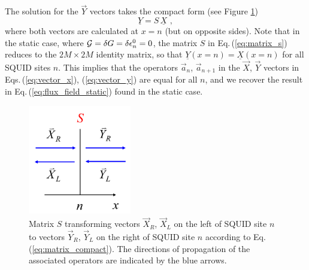 The solution for the $\vec{Y}$ vectors takes the compact form (see Figure \ref{fig:xy})
%
\begin{equation} \label{eq:matrix_compact}
    \underline{Y} = S \, \underline{X} \, \, ,
\end{equation}
%
where both vectors are calculated at $x=n$ (but on opposite sides).
Note that in the static case, where ${\cal G} = \delta G = \delta \epsilon_n^0 = 0$,
the matrix
$S$ in Eq.\,(\ref{eq:matrix_s}) reduces to the $2M \times 2M$ identity matrix,
so that $\underline{Y}(x=n) = \underline{X}(x=n)$ for all SQUID sites $n$. 
This implies that the operators $\vec{a}_n$, $\vec{a}_{n+1}$ 
in the $\vec{X}$, $\vec{Y}$ vectors in Eqs.\,(\ref{eq:vector_x}), (\ref{eq:vector_y})
are equal for all $n$, and we recover the result in Eq.\,(\ref{eq:flux_field_static})
found in the static case. 

\begin{figure}
    \includegraphics[width=0.4\textwidth, keepaspectratio]{figures/system/xy.png}
    \caption{Matrix $S$ transforming vectors $\vec{X}_R$, $\vec{X}_L$ on the left of SQUID site $n$
    to vectors $\vec{Y}_R$, $\vec{Y}_L$ on the right of SQUID site $n$ according to 
    Eq.\,(\ref{eq:matrix_compact}). The directions of propagation of the associated operators  
    are indicated by the blue arrows.}
    \label{fig:xy}
\end{figure}

